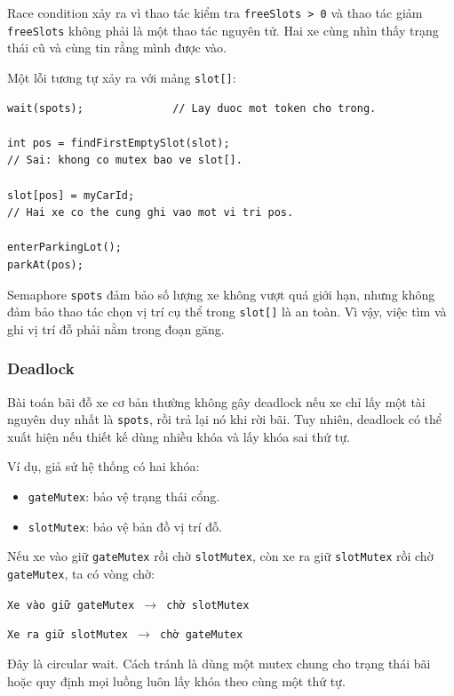 Race condition xảy ra vì thao tác kiểm tra \texttt{freeSlots > 0} và thao
tác giảm \texttt{freeSlots} không phải là một thao tác nguyên tử. Hai xe
cùng nhìn thấy trạng thái cũ và cùng tin rằng mình được vào.

Một lỗi tương tự xảy ra với mảng \texttt{slot[]}:

\begin{lstlisting}
wait(spots);              // Lay duoc mot token cho trong.

int pos = findFirstEmptySlot(slot);
// Sai: khong co mutex bao ve slot[].

slot[pos] = myCarId;
// Hai xe co the cung ghi vao mot vi tri pos.

enterParkingLot();
parkAt(pos);
\end{lstlisting}

Semaphore \texttt{spots} đảm bảo số lượng xe không vượt quá giới hạn,
nhưng không đảm bảo thao tác chọn vị trí cụ thể trong \texttt{slot[]} là
an toàn. Vì vậy, việc tìm và ghi vị trí đỗ phải nằm trong đoạn găng.

\subsubsection*{Deadlock}

Bài toán bãi đỗ xe cơ bản thường không gây deadlock nếu xe chỉ lấy một
tài nguyên duy nhất là \texttt{spots}, rồi trả lại nó khi rời bãi. Tuy
nhiên, deadlock có thể xuất hiện nếu thiết kế dùng nhiều khóa và lấy khóa
sai thứ tự.

Ví dụ, giả sử hệ thống có hai khóa:

\begin{itemize}
    \item \texttt{gateMutex}: bảo vệ trạng thái cổng.
    \item \texttt{slotMutex}: bảo vệ bản đồ vị trí đỗ.
\end{itemize}

Nếu xe vào giữ \texttt{gateMutex} rồi chờ \texttt{slotMutex}, còn xe ra giữ
\texttt{slotMutex} rồi chờ \texttt{gateMutex}, ta có vòng chờ:

\begin{center}
\texttt{Xe vào giữ gateMutex $\rightarrow$ chờ slotMutex}

\texttt{Xe ra giữ slotMutex $\rightarrow$ chờ gateMutex}
\end{center}

Đây là circular wait. Cách tránh là dùng một mutex chung cho trạng thái bãi
hoặc quy định mọi luồng luôn lấy khóa theo cùng một thứ tự.

